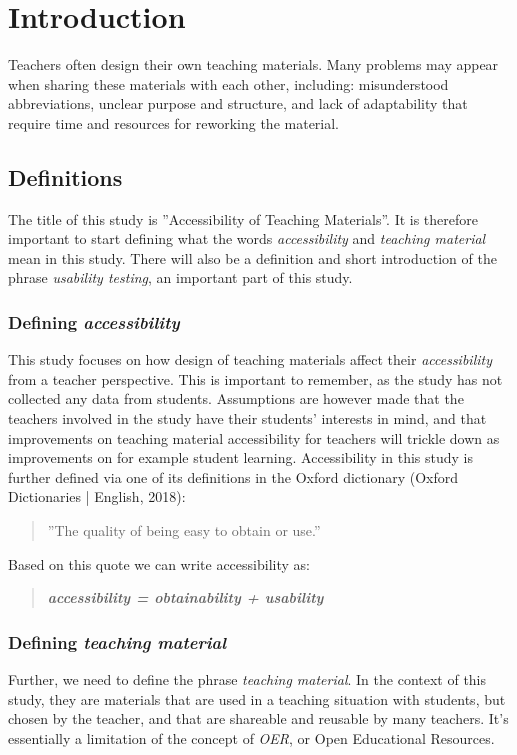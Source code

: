 \chapter{Introduction}

Teachers often design their own teaching materials. Many problems may appear when sharing these materials with each other, including: misunderstood abbreviations, unclear purpose and structure, and lack of adaptability that require time and resources for reworking the material.

\section{Definitions}
The title of this study is ''Accessibility of Teaching Materials''. It is therefore important to start defining what the words \textit{accessibility} and \textit{teaching material} mean in this study. There will also be a definition and short introduction of the phrase \textit{usability testing}, an important part of this study.

\subsection{Defining \textit{accessibility}}
This study focuses on how design of teaching materials affect their \textit{accessibility} from a teacher perspective. This is important to remember, as the study has not collected any data from students. Assumptions are however made that the teachers involved in the study have their students' interests in mind, and that improvements on teaching material accessibility for teachers will trickle down as improvements on for example student learning. Accessibility in this study is further defined via one of its definitions in the Oxford dictionary (Oxford Dictionaries | English, 2018):

\begin{quote}
    ''The quality of being easy to obtain or use.''
\end{quote}

Based on this quote we can write accessibility as:
\begin{quote}
\textbf{\textit{accessibility = obtainability + usability}}
\end{quote}

\subsection{Defining \textit{teaching material}}
Further, we need to define the phrase \textit{teaching material}. In the context of this study, they are materials that are used in a teaching situation with students, but chosen by the teacher, and that are shareable and reusable by many teachers. It's essentially a limitation of the concept of \textit{OER}, or Open Educational Resources.

